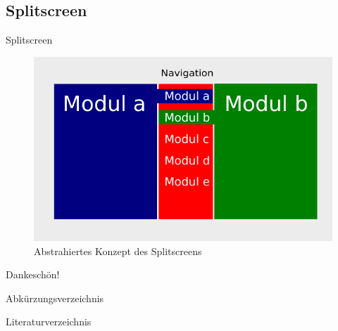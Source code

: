 \documentclass{beamer}
\begin{document}
\subsection{Splitscreen}
\begin{frame}{Splitscreen}
	\begin{figure}[]
		\centering
		\includegraphics[width=\textwidth]{gfx/splitscreen}
		\caption{Abstrahiertes Konzept des Splitscreens}
		\label{fig:splitscreen}
		\end{figure}
\end{frame}

\begin{frame}[standout]
	Dankeschön!
\end{frame}

\appendix

\begin{frame}{Abkürzungsverzeichnis}
	\begin{acronym}
	\end{acronym}
\end{frame}

\begin{frame}[allowframebreaks]{Literaturverzeichnis}
	\nocite{*}
	\printbibliography
\end{frame}
\end{document}
